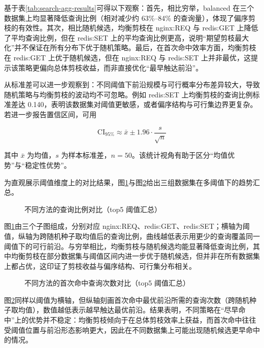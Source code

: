 \documentclass[UTF8,a4paper,12pt,twoside]{ctexart}  %
\begin{document}
基于表\ref{tab:search-agg-results}可得以下观察：首先，相比穷举，balanced 在三个数据集上均显著降低查询比例（相对减少约
63\%--84\%
的查询量），体现了偏序剪枝的有效性。其次，相比随机候选，均衡剪枝在
nginx:REQ 与 redis:GET 上降低了平均查询比例，但在 redis:SET
上的平均查询比例更高，说明``期望剪枝最大化''并不保证在所有分布下优于随机策略。最后，在首次命中效率方面，均衡剪枝在
redis:GET 上优于随机候选，但在 nginx:REQ 与 redis:SET
上并非最优，这提示该策略更偏向总体剪枝收益，而非直接优化``最早触达前沿''。

从标准差可以进一步观察到：不同阈值下前沿规模与可行概率分布差异较大，导致随机策略与均衡剪枝的波动均不可忽略。例如
redis:SET 上均衡剪枝的查询比例标准差达
0.140，表明该数据集对阈值更敏感，或者偏序结构与可行集边界更复杂。若进一步报告置信区间，可用

\begin{equation}
  \text{CI}_{95\%} \approx \bar{x} \pm 1.96\cdot \frac{s}{\sqrt{n}}
\end{equation}

其中 \(\bar{x}\) 为均值，\(s\)
为样本标准差，\(n=50\)。该统计视角有助于区分``均值优势''与``稳定性优势''。

为直观展示阈值维度上的对比结果，图\ref{fig:query-ratio-top5}与图\ref{fig:first-hit-top5}给出三组数据集在多阈值下的趋势汇总。

\begin{figure}[h]
  \centering
  
  \caption{不同方法的查询比例对比（top5 阈值汇总）}
  \label{fig:query-ratio-top5}
\end{figure}

图\ref{fig:query-ratio-top5}由三个子图组成，分别对应 nginx:REQ、redis:GET、redis:SET；横轴为阈值，纵轴为跨随机种子取均值后的查询比例，曲线越低表示用更少的查询覆盖同一阈值下的可行前沿。与穷举相比，均衡剪枝与随机候选均能显著降低查询比例，其中均衡剪枝在部分数据集与阈值区间内进一步优于随机候选，但并非在所有数据集上都占优，这印证了剪枝收益与偏序结构、可行集分布相关。

\begin{figure}[h]
  \centering
  
  \caption{不同方法的首次命中查询次数对比（top5 阈值汇总）}
  \label{fig:first-hit-top5}
\end{figure}

图\ref{fig:first-hit-top5}同样以阈值为横轴，但纵轴刻画首次命中最优前沿所需的查询次数（跨随机种子取均值），数值越低表示越早触达最优前沿。结果表明，不同策略在``尽早命中''上的优势并不稳定：均衡剪枝倾向于在总体剪枝效率上获益，而首次命中往往受阈值位置与前沿形态影响更大，因此在不同数据集上可能出现随机候选更早命中的情况。
\end{document}

